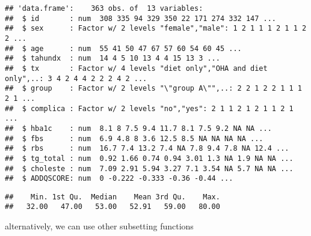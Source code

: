 \documentclass[]{book}
\newenvironment{Shaded}{\begin{snugshade}}{\end{snugshade}}
\newcommand{\KeywordTok}[1]{\textcolor[rgb]{0.13,0.29,0.53}{\textbf{#1}}}
\newcommand{\DecValTok}[1]{\textcolor[rgb]{0.00,0.00,0.81}{#1}}
\newcommand{\OperatorTok}[1]{\textcolor[rgb]{0.81,0.36,0.00}{\textbf{#1}}}
\newcommand{\NormalTok}[1]{#1}
\theoremstyle{definition}
\theoremstyle{definition}
\theoremstyle{remark}
\begin{document}
\begin{verbatim}
## 'data.frame':    363 obs. of  13 variables:
##  $ id       : num  308 335 94 329 350 22 171 274 332 147 ...
##  $ sex      : Factor w/ 2 levels "female","male": 1 2 1 1 1 2 1 1 2 2 ...
##  $ age      : num  55 41 50 47 67 57 60 54 60 45 ...
##  $ tahundx  : num  14 4 5 10 13 4 4 15 13 3 ...
##  $ tx       : Factor w/ 4 levels "diet only","OHA and diet only",..: 3 4 2 4 4 2 2 2 4 2 ...
##  $ group    : Factor w/ 2 levels "\"group A\"",..: 2 2 1 2 2 1 1 1 2 1 ...
##  $ complica : Factor w/ 2 levels "no","yes": 2 1 1 2 1 2 1 1 2 1 ...
##  $ hba1c    : num  8.1 8 7.5 9.4 11.7 8.1 7.5 9.2 NA NA ...
##  $ fbs      : num  6.9 4.8 8 3.6 12.5 8.5 NA NA NA NA ...
##  $ rbs      : num  16.7 7.4 13.2 7.4 NA 7.8 9.4 7.8 NA 12.4 ...
##  $ tg_total : num  0.92 1.66 0.74 0.94 3.01 1.3 NA 1.9 NA NA ...
##  $ choleste : num  7.09 2.91 5.94 3.27 7.1 3.54 NA 5.7 NA NA ...
##  $ ADDQSCORE: num  0 -0.222 -0.333 -0.36 -0.44 ...
\end{verbatim}

\begin{Shaded}
\end{Shaded}

\begin{verbatim}
##    Min. 1st Qu.  Median    Mean 3rd Qu.    Max. 
##   32.00   47.00   53.00   52.91   59.00   80.00
\end{verbatim}

alternatively, we can use other subsetting functions

\begin{Shaded}
\end{Shaded}
\end{document}
